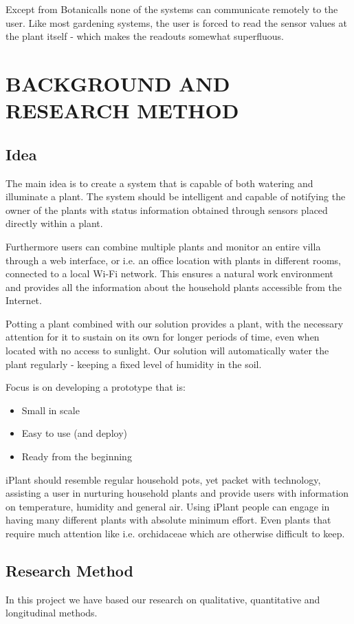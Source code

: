 \documentclass{ubicomp2012}
\begin{document}
Except from Botanicalls none of the systems can communicate remotely to the user. Like most gardening systems, the user is forced to read the sensor values at the plant itself - which makes the readouts somewhat superfluous.

\section{BACKGROUND AND RESEARCH METHOD}

\subsection{Idea}
The main idea is to create a system that is capable of both watering and illuminate a plant. The system should be intelligent and capable of notifying the owner of the plants with status information obtained through sensors placed directly within a plant.

Furthermore users can combine multiple plants and monitor an entire villa through a web interface, or i.e. an office location with plants in different rooms, connected to a local Wi-Fi network. This ensures a natural work environment and provides all the information about the household plants accessible from the Internet.

Potting a plant combined with our solution provides a plant, with the necessary attention for it to sustain on its own for longer periods of time, even when located with no access to sunlight. Our solution will automatically water the plant regularly - keeping a fixed level of humidity in the soil.

Focus is on developing a prototype that is:
\begin{itemize}
    \item Small in scale
    \item Easy to use (and deploy)
    \item Ready from the beginning
\end{itemize}

iPlant should resemble regular household pots, yet packet with technology, assisting a user in nurturing household plants and provide users with information on temperature, humidity and general air. Using iPlant people can engage in having many different plants with absolute minimum effort. Even plants that require much attention like i.e. orchidaceae which are otherwise difficult to keep.

\subsection{Research Method}
In this project we have based our research on qualitative, quantitative and longitudinal methods.
\end{document}
